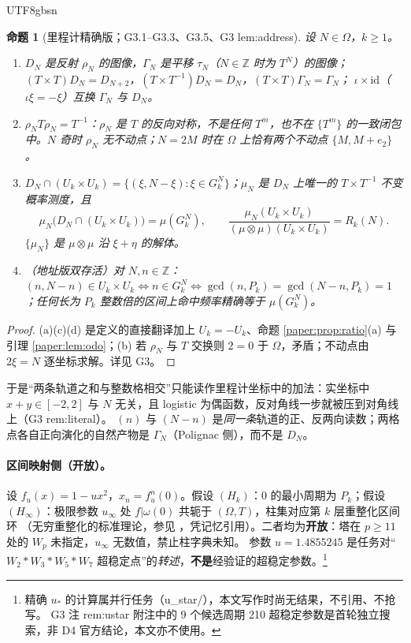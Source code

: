\documentclass[11pt,a4paper]{article}
\newcommand{\Haar}{\mu}
\newcommand{\status}[1]{\par\noindent\fbox{\textbf{状态：#1}}\par\smallskip}
\newcommand{\Om}{\Omega}               %
\newcommand{\ust}{u_{*}}               %
\newcommand{\uinf}{u_{\infty}}
\theoremstyle{plain}
\newtheorem{prop}{命题}
\theoremstyle{definition}
\begin{document}
\begin{CJK}{UTF8}{gbsn}
\begin{prop}[里程计精确版；G3.1--G3.3、G3.5、G3 lem:address]\label{paper:prop:cml}
设 $N\in\Om$，$k\ge1$。
\begin{enumerate}[label=(\alph*)]
\item $D_N$ 是反射 $\rho_N$ 的图像，$\Gamma_N$ 是平移 $\tau_N$（$N\in\mathbb Z$ 时为 $T^N$）的图像；$(T\times T)D_N=D_{N+2}$，$(T\times T^{-1})D_N=D_N$，$(T\times T)\Gamma_N=\Gamma_N$；
$\iota\times\mathrm{id}$（$\iota\xi=-\xi$）互换 $\Gamma_N$ 与 $D_N$。
\item $\rho_NT\rho_N=T^{-1}$：$\rho_N$ 是 $T$ 的反向对称，不是任何 $T^m$，也不在 $\{T^m\}$ 的一致闭包中。$N$ 奇时 $\rho_N$ 无不动点；$N=2M$ 时在 $\Om$ 上恰有两个不动点 $\{M,M+e_2\}$。
\item $D_N\cap(U_k\times U_k)=\{(\xi,N-\xi):\xi\in G_k^N\}$；$\Haar_N$ 是 $D_N$ 上唯一的 $T\times T^{-1}$ 不变概率测度，且
\[
\Haar_N\bigl(D_N\cap(U_k\times U_k)\bigr)=\Haar(G_k^N),\qquad
\frac{\Haar_N(U_k\times U_k)}{(\Haar\otimes\Haar)(U_k\times U_k)}=R_k(N).
\]
$\{\Haar_N\}$ 是 $\Haar\otimes\Haar$ 沿 $\xi+\eta$ 的解体。
\item（地址版双存活）对 $N,n\in\mathbb Z$：$(n,N-n)\in U_k\times U_k\iff n\in G_k^N\iff\gcd(n,P_k)=\gcd(N-n,P_k)=1$；任何长为 $P_k$ 整数倍的区间上命中频率精确等于 $\Haar(G_k^N)$。
\end{enumerate}
\end{prop}
\status{已证（里程计层，无条件）}
\begin{proof}
(a)(c)(d) 是定义的直接翻译加上 $U_k=-U_k$、命题 \ref{paper:prop:ratio}(a) 与引理 \ref{paper:lem:odo}；(b) 若 $\rho_N$ 与 $T$ 交换则 $2=0$ 于 $\Om$，矛盾；不动点由 $2\xi=N$ 逐坐标求解。详见 G3。
\end{proof}

\noindent 于是“两条轨道之和与整数格相交”只能读作里程计坐标中的加法：实坐标中 $x+y\in[-2,2]$ 与 $N$ 无关，且 logistic 为偶函数，反对角线一步就被压到对角线上（G3 rem:literal）。
$(n)$ 与 $(N-n)$ 是\emph{同一条}轨道的正、反两向读数；两格点各自正向演化的自然产物是 $\Gamma_N$（Polignac 侧），而不是 $D_N$。

\paragraph{区间映射侧（开放）。}
设 $f_u(x)=1-ux^2$，$x_n=f_u^n(0)$。假设 $(H_k)$：$0$ 的最小周期为 $P_k$；假设 $(H_\infty)$：极限参数 $\uinf$ 处 $f|\omega(0)$ 共轭于 $(\Om,T)$，柱集对应第 $k$ 层重整化区间环
（无穷重整化的标准理论，参见 \cite{dMvS93}，凭记忆引用）。二者均为\textbf{开放}：塔在 $p\ge11$ 处的 $W_p$ 未指定，$\uinf$ 无数值，禁止柱字典未知。
参数 $u=1.4855245$ 是任务对“$W_2*W_3*W_5*W_7$ 超稳定点”的\emph{转述}，\textbf{不是}经验证的超稳定参数。\footnote{精确 $\ust$ 的计算属并行任务（u\_star/），本文写作时尚无结果，不引用、不抢写。
G3 注 rem:ustar 附注中的 9 个候选周期 210 超稳定参数是首轮独立搜索，非 D4 官方结论，本文亦不使用。}


\end{CJK}
\end{document}

